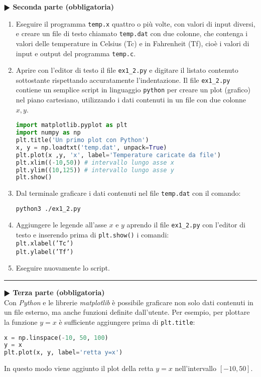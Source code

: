 \documentclass[11pt]{article}
\begin{document}

\textbf{$\RHD$ Seconda parte (obbligatoria)} 
%
\begin{enumerate}
\item Eseguire il programma \texttt{temp.x} quattro o più volte, con valori di input diversi, e creare un file di testo chiamato \texttt{temp.dat} con due colonne,
  che contenga i valori delle temperature in Celsius (Tc) e
  in Fahrenheit (Tf), cioè i valori di input e output del programma \texttt{temp.c}.
\item Aprire con l'editor di testo il file \texttt{ex1\_2.py} e digitare il listato
  contenuto sottostante rispettando accuratamente l'indentazione. Il file \texttt{ex1\_2.py} contiene un
  semplice script in linguaggio \texttt{python} per creare un plot (grafico) nel piano cartesiano, utilizzando i dati contenuti in un file con due colonne $x,y$. 
\begin{lstlisting}[caption={Programma {\it python} \texttt{ex1\_2.py}},language=Python]
import matplotlib.pyplot as plt
import numpy as np
plt.title('Un primo plot con Python')
x, y = np.loadtxt('temp.dat', unpack=True)
plt.plot(x ,y, 'x', label='Temperature caricate da file')
plt.xlim((-10,50)) # intervallo lungo asse x
plt.ylim((10,125)) # intervallo lungo asse y
plt.show()
\end{lstlisting}
\item Dal terminale graficare i dati contenuti nel file \texttt{temp.dat} con il comando:\\
  \begin{lstlisting}[language=bash,numbers=none]
    python3 ./ex1_2.py
\end{lstlisting}
\item Aggiungere le legende all'asse $x$ e $y$ aprendo il file \texttt{ex1\_2.py} con l'editor di testo e inserendo prima di \texttt{plt.show()} i comandi:
\\
\texttt{plt.xlabel('Tc')}
\\
\texttt{plt.ylabel('Tf')}
 \item Eseguire nuovamente lo script.
 \end{enumerate}


\hrule
\vspace{2mm}\textbf{$\RHD$ Terza parte (obbligatoria)\\}
%
Con {\it Python\/} e le librerie {\it matplotlib\/} \`e possibile graficare non solo dati contenuti in un file esterno, ma anche funzioni definite dall'utente. Per esempio, 
per plottare la funzione $y=x$ \`e sufficiente aggiungere prima di \texttt{plt.title}: 
\begin{lstlisting}[language=python]
x = np.linspace(-10, 50, 100)
y = x
plt.plot(x, y, label='retta y=x')
\end{lstlisting}
In questo modo viene aggiunto il plot della retta $y=x$ nell'intervallo $[-10,50]$. 
\end{document}
